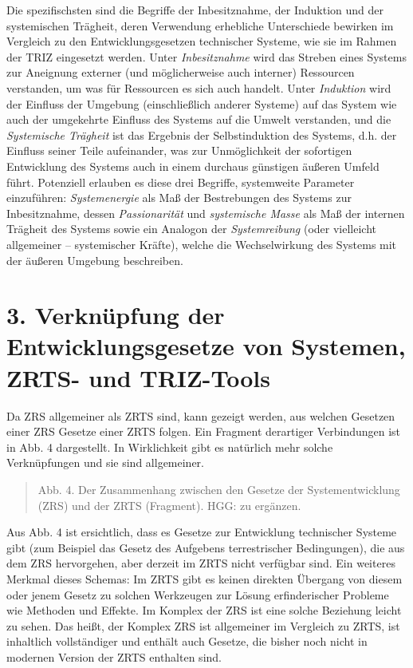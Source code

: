 \documentclass[11pt,a4paper]{article}
\begin{document}
Die spezifischsten sind die Begriffe der Inbesitznahme, der Induktion und der
systemischen Trägheit, deren Verwendung erhebliche Unterschiede bewirken im
Vergleich zu den Entwicklungsgesetzen technischer Systeme, wie sie im Rahmen
der TRIZ eingesetzt werden. Unter \emph{Inbesitznahme} wird das Streben eines
Systems zur Aneignung externer (und möglicherweise auch interner) Ressourcen
verstanden, um was für Ressourcen es sich auch handelt. Unter \emph{Induktion}
wird der Einfluss der Umgebung (einschließlich anderer Systeme) auf das System
wie auch der umgekehrte Einfluss des Systems auf die Umwelt verstanden, und
die \emph{Systemische Trägheit} ist das Ergebnis der Selbstinduktion des
Systems, d.h. der Einfluss seiner Teile aufeinander, was zur Unmöglichkeit der
sofortigen Entwicklung des Systems auch in einem durchaus günstigen äußeren
Umfeld führt. Potenziell erlauben es diese drei Begriffe, systemweite
Parameter einzuführen: \emph{Systemenergie} als Maß der Bestrebungen des
Systems zur Inbesitznahme, dessen \emph{Passionarität} und \emph{systemische
  Masse} als Maß der internen Trägheit des Systems sowie ein Analogon der
\emph{Systemreibung} (oder vielleicht allgemeiner -- systemischer Kräfte),
welche die Wechselwirkung des Systems mit der äußeren Umgebung beschreiben.

\section*{3. Verknüpfung der Entwicklungsgesetze von Systemen,\\ ZRTS- und
  TRIZ-Tools}

Da ZRS allgemeiner als ZRTS sind, kann gezeigt werden, aus welchen Gesetzen
einer ZRS Gesetze einer ZRTS folgen. Ein Fragment derartiger Verbindungen ist
in Abb. 4 dargestellt. In Wirklichkeit gibt es natürlich mehr solche
Verknüpfungen und sie sind allgemeiner.
\begin{quote}
  Abb. 4. Der Zusammenhang zwischen den Gesetze der Systementwicklung (ZRS)
  und der ZRTS (Fragment). HGG: zu ergänzen.
\end{quote}
Aus Abb. 4 ist ersichtlich, dass es Gesetze zur Entwicklung technischer
Systeme gibt (zum Beispiel das Gesetz des Aufgebens terrestrischer
Bedingungen), die aus dem ZRS hervorgehen, aber derzeit im ZRTS nicht
verfügbar sind. Ein weiteres Merkmal dieses Schemas: Im ZRTS gibt es keinen
direkten Übergang von diesem oder jenem Gesetz zu solchen Werkzeugen zur
Lösung erfinderischer Probleme wie Methoden und Effekte. Im Komplex der ZRS
ist eine solche Beziehung leicht zu sehen. Das heißt, der Komplex ZRS ist
allgemeiner im Vergleich zu ZRTS, ist inhaltlich vollständiger und enthält
auch Gesetze, die bisher noch nicht in modernen Version der ZRTS enthalten
sind.
\end{document}
